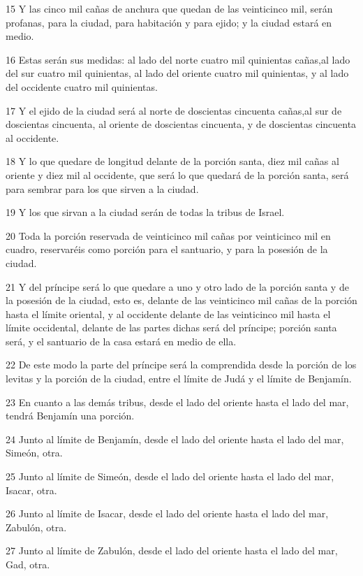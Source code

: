 \par 15 Y las cinco mil cañas de anchura que quedan de las veinticinco mil, serán profanas, para la ciudad, para habitación y para ejido; y la ciudad estará en medio.
\par 16 Estas serán sus medidas: al lado del norte cuatro mil quinientas cañas,al lado del sur cuatro mil quinientas, al lado del oriente cuatro mil quinientas, y al lado del occidente cuatro mil quinientas.
\par 17 Y el ejido de la ciudad será al norte de doscientas cincuenta cañas,al sur de doscientas cincuenta, al oriente de doscientas cincuenta, y de doscientas cincuenta al occidente. 
\par 18 Y lo que quedare de longitud delante de la porción santa, diez mil cañas al oriente y diez mil al occidente, que será lo que quedará de la porción santa, será para sembrar para los que sirven a la ciudad.
\par 19 Y los que sirvan a la ciudad serán de todas la tribus de Israel.
\par 20 Toda la porción reservada de veinticinco mil cañas por veinticinco mil en cuadro, reservaréis como porción para el santuario, y para la posesión de la ciudad.
\par 21 Y del príncipe será lo que quedare a uno y otro lado de la porción santa y de la posesión de la ciudad, esto es, delante de las veinticinco mil cañas de la porción hasta el límite oriental, y al occidente delante de las veinticinco mil hasta el límite occidental, delante de las partes dichas será del príncipe; porción santa será, y el santuario de la casa estará en medio de ella.
\par 22 De este modo la parte del príncipe será la comprendida desde la porción de los levitas y la porción de la ciudad, entre el límite de Judá y el límite de Benjamín.
\par 23 En cuanto a las demás tribus, desde el lado del oriente hasta el lado del mar, tendrá Benjamín una porción.
\par 24 Junto al límite de Benjamín, desde el lado del oriente hasta el lado del mar, Simeón, otra.
\par 25 Junto al límite de Simeón, desde el lado del oriente hasta el lado del mar, Isacar, otra.
\par 26 Junto al límite de Isacar, desde el lado del oriente hasta el lado del mar, Zabulón, otra.
\par 27 Junto al límite de Zabulón, desde el lado del oriente hasta el lado del mar, Gad, otra.
